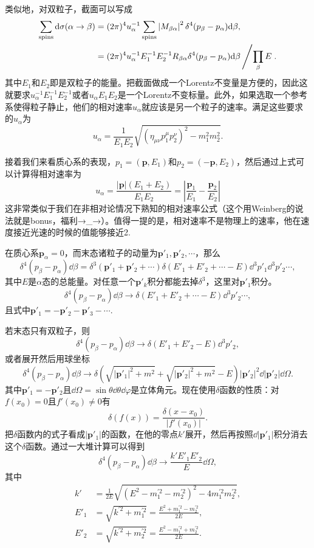 类似地，对双粒子，截面可以写成
\[
	\begin{split}
	\sum_{\text{spins}}\mathrm{d} \sigma (\alpha\to\beta)&=(2\pi)^{4}u_\alpha^{-1}\sum_{\text{spins}}\left|M_{\beta\alpha}\right|^2\delta^4(p_\beta-p_\alpha)\mathrm{d} \beta,\\
	&=(2\pi)^{4}u_\alpha^{-1}E^{-1}_{1}E^{-1}_{2}R_{\beta\alpha}\delta^4(p_\beta-p_\alpha)\mathrm{d} \beta\left/\prod_\beta E\right..
	\end{split}
\]
其中$E_{1}$和$E_{2}$即是双粒子的能量。把截面做成一个Lorentz不变量是方便的，因此这就要求$u_\alpha^{-1}E^{-1}_{1}E^{-1}_{2}$或者$u_\alpha E_{1}E_{2}$是一个Lorentz不变标量。此外，如果选取一个参考系使得粒子静止，他们的相对速率$u_\alpha$就应该是另一个粒子的速率。满足这些要求的$u_\alpha$为
\[
	u_\alpha=\frac{1}{E_{1}E_{2}} \sqrt{\left(\eta_{\mu\nu}p_1^\mu p_2^\nu\right)^2-m_1^2 m_2^2}.
\]

接着我们来看质心系的表现，$p_1=(\bm{p},E_1)$和$p_2=(-\bm{p},E_2)$，然后通过上式可以计算得相对速率为
\[
	u_\alpha=\frac{|\bm{p}|(E_1+E_2)}{E_1 E_2}=\left|\frac{\bm{p}_1}{E_1}-\frac{\bm{p}_2}{E_2}\right|
\]
这非常类似于我们在非相对论情况下熟知的相对速率公式（这个用Weinberg的说法就是bonus，福利→\_→）。值得一提的是，相对速率不是物理上的速率，他在速度接近光速的时候的值能够接近2.

在质心系$\bm{p}_\alpha=0$，而末态诸粒子的动量为$\bm{p}'_1,\bm{p}'_2,\cdots$，那么
\[
	\delta^4(p_\beta-p_\alpha)\dd \beta=\delta^3(\bm{p}'_1+\bm{p}'_2+\cdots)\delta(E'_1+E'_2+\cdots-E)\dd^3 p'_1 \dd^3 p'_2\cdots,
\]
其中$E$是$\alpha$态的总能量。对任意一个$\bm{p}'_k$积分都能去掉$\delta^3$，这里对$\bm{p}'_1$积分。
\[
	\delta^4(p_\beta-p_\alpha)\dd \beta \to\delta(E'_1+E'_2+\cdots-E)\dd^3 p'_2\cdots,
\]
且式中$\bm{p}'_1=-\bm{p}'_2-\bm{p}'_3-\cdots$.

若末态只有双粒子，则
\[
	\delta^4(p_\beta-p_\alpha)\dd \beta \to\delta(E'_1+E'_2-E)\dd^3 p'_2,
\]
或者展开然后用球坐标
\[
	\delta^4(p_\beta-p_\alpha)\dd \beta \to\delta\left(\sqrt{|\bm{p}'_1|^2+m^2}+\sqrt{|\bm{p}'_2|^2+m^2}-E\right)|\bm{p}'_2|^2 \dd |\bm{p}'_2| \dd \Omega.
\]
其中$\bm{p}'_1=-\bm{p}'_2$且$\dd \Omega=\sin\theta\dd\theta\dd\varphi$是立体角元。现在使用$\delta$函数的性质：对$f(x_0)=0$且$f'(x_0)\neq 0$有
\[
	\delta\left(f(x)\right)=\frac{\delta(x-x_0)}{|f'(x_0)|}.
\]
把$\delta$函数内的式子看成$|\bm{p}'_1|$的函数，在他的零点$k'$展开，然后再按照$\dd |\bm{p}'_1|$积分消去这个$\delta$函数。通过一大堆计算可以得到
\[
	\delta^4(p_\beta-p_\alpha)\dd \beta \to \frac{k'E'_1 E'_2}{E}\dd \Omega,
\]
其中
\[
	\begin{split}
		k'&=\frac{1}{2E}\sqrt{(E^2-m^{\prime 2}_1-m^{\prime 2}_2)^2-4m^{\prime 2}_1 m^{\prime 2}_2},\\
		E'_1&=\sqrt{k^{\prime 2}+m^{\prime 2}_1}=\frac{E^2+m^{\prime 2}_1-m^{\prime 2}_2}{2E},\\
		E'_2&=\sqrt{k^{\prime 2}+m^{\prime 2}_2}=\frac{E^2-m^{\prime 2}_1+m^{\prime 2}_2}{2E}.
	\end{split}
\]

